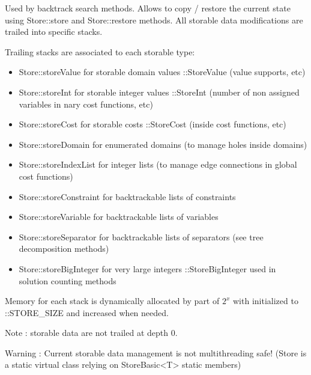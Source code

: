 \documentclass[letterpaper,10pt,openany,oneside,english]{sphinxmanual}
\begin{document}
\begin{fulllineitems}

\pysigstartsignatures
{}
\pysigstopsignatures
\sphinxAtStartPar
Used by backtrack search methods. Allows to copy / restore the current state using Store::store and Store::restore methods. All storable data modifications are trailed into specific stacks.

\sphinxAtStartPar
Trailing stacks are associated to each storable type:\begin{itemize}
\item {} 
\sphinxAtStartPar
Store::storeValue for storable domain values ::StoreValue (value supports, etc)

\item {} 
\sphinxAtStartPar
Store::storeInt for storable integer values ::StoreInt (number of non assigned variables in nary cost functions, etc)

\item {} 
\sphinxAtStartPar
Store::storeCost for storable costs ::StoreCost (inside cost functions, etc)

\item {} 
\sphinxAtStartPar
Store::storeDomain for enumerated domains (to manage holes inside domains)

\item {} 
\sphinxAtStartPar
Store::storeIndexList for integer lists (to manage edge connections in global cost functions)

\item {} 
\sphinxAtStartPar
Store::storeConstraint for backtrackable lists of constraints

\item {} 
\sphinxAtStartPar
Store::storeVariable for backtrackable lists of variables

\item {} 
\sphinxAtStartPar
Store::storeSeparator for backtrackable lists of separators (see tree decomposition methods)

\item {} 
\sphinxAtStartPar
Store::storeBigInteger for very large integers ::StoreBigInteger used in solution counting methods

\end{itemize}


\sphinxAtStartPar
Memory for each stack is dynamically allocated by part of \(2^x\) with  initialized to ::STORE\_SIZE and increased when needed.

\sphinxAtStartPar
Note : storable data are not trailed at depth 0.

\sphinxAtStartPar
Warning : Current storable data management is not multi\sphinxhyphen{}threading safe! (Store is a static virtual class relying on StoreBasic\textless{}T\textgreater{} static members) 

\end{fulllineitems}
\end{document}
